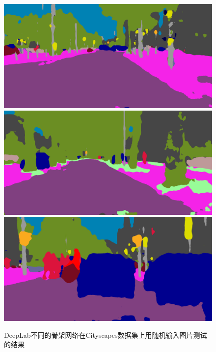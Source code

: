 \documentclass[10pt, a4paper]{article}
\begin{document}
\begin{figure}[h]
\begin{minipage}[b]{0.8\linewidth}
{\begin{minipage}[b]{0.31\linewidth}
        \includegraphics[width=\linewidth]{imgs/r101-bonn_000015_000019_leftImg8bit.png}\vspace{0pt}
        \includegraphics[width=\linewidth]{imgs/r101-leverkusen_000013_000019_leftImg8bit.png}\vspace{0pt}
        \includegraphics[width=\linewidth]{imgs/r101-munich_000079_000019_leftImg8bit.png}
      \end{minipage}
    }
    \end{minipage}
    \vfill
    \caption{DeepLab不同的骨架网络在Cityscapes数据集上用随机输入图片测试的结果}
    \label{p10}
\end{figure}
\end{document}
